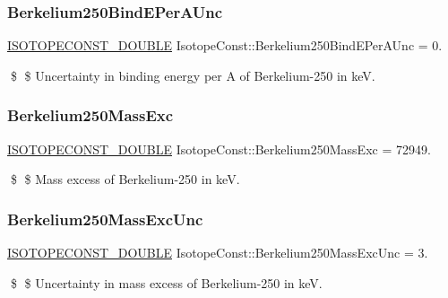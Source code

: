 \subsubsection{\texorpdfstring{Berkelium250\+Bind\+E\+Per\+A\+Unc}{Berkelium250BindEPerAUnc}}
{\footnotesize\ttfamily \mbox{\hyperlink{group___isotope_const-_macros_ga8f45a7272ce02c0b4c65c44636ed719a}{I\+S\+O\+T\+O\+P\+E\+C\+O\+N\+S\+T\+\_\+\+D\+O\+U\+B\+LE}} Isotope\+Const\+::\+Berkelium250\+Bind\+E\+Per\+A\+Unc = 0.}

\$ \$ Uncertainty in binding energy per A of Berkelium-\/250 in keV. \mbox{\label{group___isotope_const-_berkelium-_bk250_gae5fca81a0f0fdf09023a9040eaf535ed}} 
\subsubsection{\texorpdfstring{Berkelium250\+Mass\+Exc}{Berkelium250MassExc}}
{\footnotesize\ttfamily \mbox{\hyperlink{group___isotope_const-_macros_ga8f45a7272ce02c0b4c65c44636ed719a}{I\+S\+O\+T\+O\+P\+E\+C\+O\+N\+S\+T\+\_\+\+D\+O\+U\+B\+LE}} Isotope\+Const\+::\+Berkelium250\+Mass\+Exc = 72949.}

\$ \$ Mass excess of Berkelium-\/250 in keV. \mbox{\label{group___isotope_const-_berkelium-_bk250_gaf7ed3ea64d2eae63cc989b7223fb63f8}} 
\subsubsection{\texorpdfstring{Berkelium250\+Mass\+Exc\+Unc}{Berkelium250MassExcUnc}}
{\footnotesize\ttfamily \mbox{\hyperlink{group___isotope_const-_macros_ga8f45a7272ce02c0b4c65c44636ed719a}{I\+S\+O\+T\+O\+P\+E\+C\+O\+N\+S\+T\+\_\+\+D\+O\+U\+B\+LE}} Isotope\+Const\+::\+Berkelium250\+Mass\+Exc\+Unc = 3.}

\$ \$ Uncertainty in mass excess of Berkelium-\/250 in keV. \mbox{\label{group___isotope_const-_berkelium-_bk250_ga5cbefa2fce864d2221fc0bfcf8ea5d34}} 
